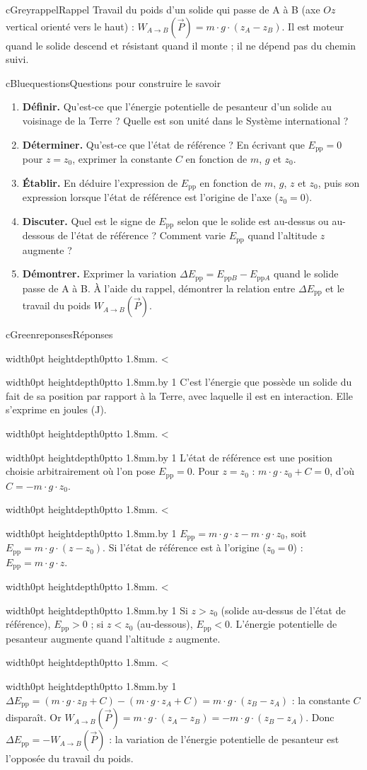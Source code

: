 \documentclass[11pt,a4paper]{article}
\newcommand{\vect}[1]{\overrightarrow{#1}}
\newcommand{\kw}[1]{{\sffamily\bfseries\color{cBlue}#1}}   %
\newenvironment{rappel}{\begin{encart}{cGrey}{rappel}{Rappel}}{\end{encart}}
\newif\ifeleve
\newlength{\interligne}\setlength{\interligne}{7mm}
\newlength{\replen}
\newcommand{\pointilles}{{\color{cInk2!60}\leaders\hbox to 1.8mm{\hss.\hss}\hfill}\kern0pt}
\newcommand{\lignes}[1]{\leavevmode\vrule width0pt height\dimexpr\interligne-1mm\relax depth0pt\pointilles
  \lgn=1 \loop\ifnum\lgn<#1 \par\nointerlineskip\noindent\vrule width0pt height\interligne depth0pt\pointilles\advance\lgn by 1 \repeat}
\newcommand{\rep}[1]{%
  \ifeleve
    \sbox{\repbox}{\parbox{\linewidth}{#1}}%
    \replen=\dimexpr\ht\repbox+\dp\repbox\relax
    \repn=\numexpr\replen/\baselineskip+1\relax
    \ifnum\repn<2 \repn=2\fi
    \edef\nblignes{\the\repn}\lignes{\nblignes}%
  \else #1\fi}
\newcommand{\titrereponses}{\ifeleve Mes réponses\else Réponses\fi}
\newcommand{\Epp}{E_{\mathrm{pp}}}
\newcommand{\Eppi}[1]{E_{\mathrm{pp}#1}}
\newcommand{\WAB}[1]{W_{A\to B}(\vect{#1})}
\begin{document}
\begin{rappel}
Travail du poids d’un solide qui passe de A à B (axe $Oz$ vertical orienté vers le haut) : $W_{A\to B}(\vect P) = m\cdot g\cdot(z_A - z_B)$. Il est moteur quand le solide descend et résistant quand il monte ; il ne dépend pas du chemin suivi.
\end{rappel}

\begin{rub}{cBlue}{questions}{Questions pour construire le savoir}
\begin{enumerate}
  \item \kw{Définir.} Qu’est-ce que l’énergie potentielle de pesanteur d’un solide au voisinage de la Terre ? Quelle est son unité dans le Système international ?
  \item \kw{Déterminer.} Qu’est-ce que l’état de référence ? En écrivant que $\Epp = 0$ pour $z = z_0$, exprimer la constante $C$ en fonction de $m$, $g$ et $z_0$.
  \item \kw{Établir.} En déduire l’expression de $\Epp$ en fonction de $m$, $g$, $z$ et $z_0$, puis son expression lorsque l’état de référence est l’origine de l’axe ($z_0 = 0$).
  \item \kw{Discuter.} Quel est le signe de $\Epp$ selon que le solide est au-dessus ou au-dessous de l’état de référence ? Comment varie $\Epp$ quand l’altitude $z$ augmente ?
  \item \kw{Démontrer.} Exprimer la variation $\Delta\Epp = \Eppi{B} - \Eppi{A}$ quand le solide passe de A à B. À l’aide du rappel, démontrer la relation entre $\Delta\Epp$ et le travail du poids $\WAB P$.
\end{enumerate}
\end{rub}

\begin{rub}{cGreen}{reponses}{\titrereponses}
\begin{reps}
  \item \rep{C’est l’énergie que possède un solide du fait de sa position par rapport à la Terre, avec laquelle il est en interaction. Elle s’exprime en joules (J).}
  \item \rep{L’état de référence est une position choisie arbitrairement où l’on pose $\Epp = 0$. Pour $z = z_0$ : $m\cdot g\cdot z_0 + C = 0$, d’où $C = -m\cdot g\cdot z_0$.}
  \item \rep{$\Epp = m\cdot g\cdot z - m\cdot g\cdot z_0$, soit $\Epp = m\cdot g\cdot(z - z_0)$. Si l’état de référence est à l’origine ($z_0 = 0$) : $\Epp = m\cdot g\cdot z$.}
  \item \rep{Si $z > z_0$ (solide au-dessus de l’état de référence), $\Epp > 0$ ; si $z < z_0$ (au-dessous), $\Epp < 0$. L’énergie potentielle de pesanteur augmente quand l’altitude $z$ augmente.}
  \item \rep{$\Delta\Epp = (m\cdot g\cdot z_B + C) - (m\cdot g\cdot z_A + C) = m\cdot g\cdot(z_B - z_A)$ : la constante $C$ disparaît. Or $\WAB P = m\cdot g\cdot(z_A - z_B) = -m\cdot g\cdot(z_B - z_A)$. Donc $\Delta\Epp = -\WAB P$ : la variation de l’énergie potentielle de pesanteur est l’opposée du travail du poids.}
\end{reps}
\end{rub}
\end{document}

